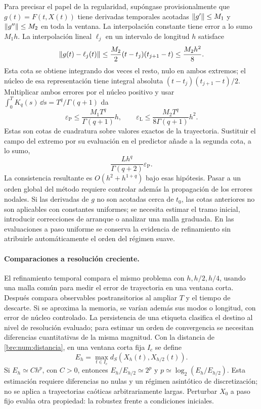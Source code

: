 Para precisar el papel de la regularidad, supóngase provisionalmente que
\(g(t)=F(t,X(t))\) tiene derivadas temporales acotadas
\(\left\lVert g'\right\rVert\leq M_1\) y \(\left\lVert g''\right\rVert\leq M_2\) en toda la ventana.
La interpolación constante tiene error a lo sumo \(M_1h\). La interpolación
lineal \(\ell_j\) en un intervalo de longitud \(h\) satisface
\[
 \left\lVert g(t)-\ell_j(t)\right\rVert
 \leq\frac{M_2}{2}(t-t_j)(t_{j+1}-t)
 \leq\frac{M_2h^2}{8}.
\]
Esta cota se obtiene integrando dos veces el resto, nulo en ambos extremos;
el núcleo de esa representación tiene integral absoluta
\((t-t_j)(t_{j+1}-t)/2\). Multiplicar ambos errores por el núcleo positivo y
usar \(\int_0^T K_q(s)\,\dd s=T^q/\Gamma(q+1)\) da
\[
 \varepsilon_{\mathrm P}\leq\frac{M_1T^q}{\Gamma(q+1)}h,
 \qquad
 \varepsilon_{\mathrm L}\leq\frac{M_2T^q}{8\Gamma(q+1)}h^2.
\]
Estas son cotas de cuadratura sobre valores exactos de la trayectoria.
Sustituir el campo del extremo por su evaluación en el predictor añade a la
segunda cota, a lo sumo,
\[
 \frac{Lh^q}{\Gamma(q+2)}\varepsilon_{\mathrm P}.
\]
La consistencia resultante es \(O(h^2+h^{1+q})\) bajo esas hipótesis. Pasar
a un orden global del método requiere controlar además la propagación de
los errores nodales. Si las derivadas de \(g\) no son acotadas cerca de
\(t_0\), las cotas anteriores no son aplicables con constantes uniformes;
se necesita estimar el tramo inicial, introducir correcciones de arranque o
analizar una malla graduada. En las evaluaciones a paso uniforme se conserva
la evidencia de refinamiento sin atribuirle automáticamente el orden del
régimen suave.

\paragraph{Comparaciones a resolución creciente.}
El refinamiento temporal compara el mismo problema con $h,h/2,h/4$, usando
una malla común para medir el error de trayectoria en una ventana corta.
Después compara observables postransitorios al ampliar $T$ y el tiempo de
descarte. Si se aproxima la memoria, se varían además sus modos o longitud,
con error de núcleo controlado. La persistencia de una etiqueta clasifica
el destino al nivel de resolución evaluado; para estimar un orden de
convergencia se necesitan diferencias cuantitativas de la misma magnitud.
Con la distancia de \eqref{bre:num:distancia}, en una ventana corta fija \(I_c\) se define
\[
 E_h=\max_{t\in I_c}d_S(X_h(t),X_{h/2}(t)).
\]
Si \(E_h\simeq Ch^p\), con \(C>0\), entonces
\(E_h/E_{h/2}\simeq2^p\) y
\(p\simeq\log_2(E_h/E_{h/2})\). Esta estimación requiere diferencias no
nulas y un régimen asintótico de discretización; no se aplica a trayectorias
caóticas arbitrariamente largas. Perturbar $X_0$ a paso fijo evalúa otra propiedad: la robustez frente
a condiciones iniciales.

